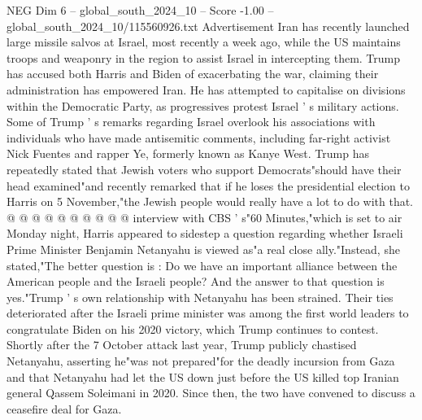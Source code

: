 \begin{textsample}{NEG Dim 6 – global\_south\_2024\_10 – Score -1.00 – global\_south\_2024\_10/115560926.txt}
Advertisement Iran has recently launched large missile salvos at Israel, most recently a week ago, while the US maintains troops and weaponry in the region to assist Israel in intercepting them.
Trump has accused both Harris and Biden of exacerbating the war, claiming their administration has empowered Iran.
He has attempted to capitalise on divisions within the Democratic Party, as progressives protest Israel ' s military actions.
Some of Trump ' s remarks regarding Israel overlook his associations with individuals who have made antisemitic comments, including far-right activist Nick Fuentes and rapper Ye, formerly known as Kanye West.
Trump has repeatedly stated that Jewish voters who support Democrats"should have their head examined"and recently remarked that if he loses the presidential election to Harris on 5 November,"the Jewish people would really have a lot to do with that. @ @ @ @ @ @ @ @ @ @ interview with CBS ' s"60 Minutes,"which is set to air Monday night, Harris appeared to sidestep a question regarding whether Israeli Prime Minister Benjamin Netanyahu is viewed as"a real close ally."Instead, she stated,"The better question is : Do we have an important alliance between the American people and the Israeli people?
And the answer to that question is yes."Trump ' s own relationship with Netanyahu has been strained.
Their ties deteriorated after the Israeli prime minister was among the first world leaders to congratulate Biden on his 2020 victory, which Trump continues to contest.
Shortly after the 7 October attack last year, Trump publicly chastised Netanyahu, asserting he"was not prepared"for the deadly incursion from Gaza and that Netanyahu had let the US down just before the US killed top Iranian general Qassem Soleimani in 2020.
Since then, the two have convened to discuss a ceasefire deal for Gaza.

\end{textsample}
